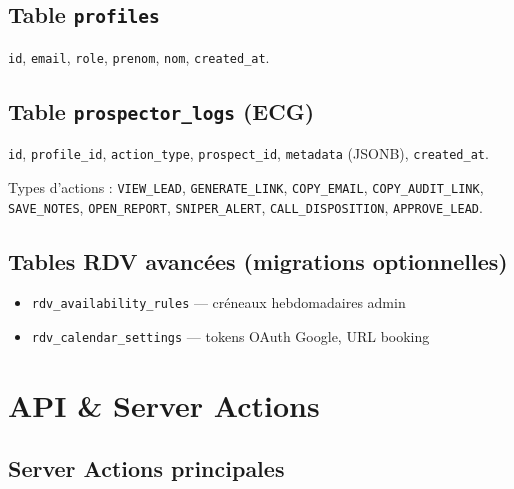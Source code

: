 \documentclass[11pt,a4paper]{report}
\begin{document}
\section{Table \texttt{profiles}}

\texttt{id}, \texttt{email}, \texttt{role}, \texttt{prenom}, \texttt{nom}, \texttt{created\_at}.

\section{Table \texttt{prospector\_logs} (ECG)}

\texttt{id}, \texttt{profile\_id}, \texttt{action\_type}, \texttt{prospect\_id}, \texttt{metadata} (JSONB), \texttt{created\_at}.

Types d'actions : \texttt{VIEW\_LEAD}, \texttt{GENERATE\_LINK}, \texttt{COPY\_EMAIL}, \texttt{COPY\_AUDIT\_LINK}, \texttt{SAVE\_NOTES}, \texttt{OPEN\_REPORT}, \texttt{SNIPER\_ALERT}, \texttt{CALL\_DISPOSITION}, \texttt{APPROVE\_LEAD}.

\section{Tables RDV avancées (migrations optionnelles)}

\begin{itemize}[noitemsep]
  \item \texttt{rdv\_availability\_rules} --- créneaux hebdomadaires admin
  \item \texttt{rdv\_calendar\_settings} --- tokens OAuth Google, URL booking
\end{itemize}

\chapter{API \& Server Actions}

\section{Server Actions principales}
\end{document}
